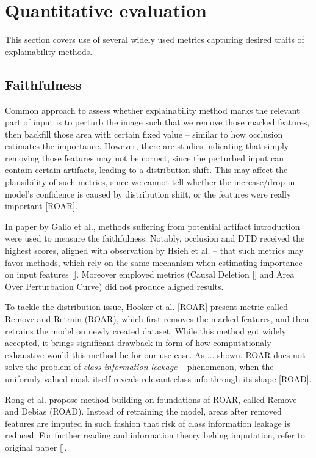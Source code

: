 \section{Quantitative evaluation}

This section covers use of several widely used metrics capturing desired traits of explainability methods.

\subsection*{Faithfulness}

Common approach to assess whether explainability method marks the relevant part of input is to perturb the image such that we remove those marked features, then backfill those area with certain fixed value -- similar to how occlusion estimates the importance. However, there are studies indicating that simply removing those features may not be correct, since the perturbed input can contain certain artifacts, leading to a distribution shift. This may affect the plausibility of such metrics, since we cannot tell whether the increase/drop in model's confidence is caused by distribution shift, or the features were really important [ROAR].

In paper by Gallo et al., methods suffering from potential artifact introduction were used to measure the faithfulness. Notably, occlusion and DTD received the highest scores, aligned with observation by Hsieh et al. -- that such metrics may favor methods, which rely on the same mechanism when estimating importance on input features []. Moreover employed metrics (Causal Deletion [] and Area Over Perturbation Curve) did not produce aligned results.

To tackle the distribution issue, Hooker et al. [ROAR] present metric called Remove and Retrain (ROAR), which first removes the marked features, and then retrains the model on newly created dataset. While this method got widely accepted, it brings significant drawback in form of how computationaly exhaustive would this method be for our use-case. As ... shown, ROAR does not solve the problem of \emph{class information leakage} -- phenomenon, when the uniformly-valued mask itself reveals relevant class info through its shape [ROAD].

Rong et al. propose method building on foundations of ROAR, called Remove and Debias (ROAD). Instead of retraining the model, areas after removed features are imputed in such fashion that risk of class information leakage is reduced. For further reading and information theory behing imputation, refer to original paper [].

